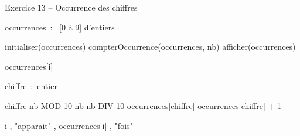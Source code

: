 \begin{Emphase}{Exercice 13 -- Occurrence des chiffres}

\begin{pseudoN}


    \Decl occurrences~:~ [0 à 9] d’entiers

    \Let initialiser(occurrences)
    \Let compterOccurrence(occurrences, nb)
    \Let afficher(occurrences)

\EndModule

    \Empty



        \Let occurrences[i] 

    \EndFor

\EndModule

    \Empty


    \Decl chiffre~:~entier


        \Let chiffre \Gets nb MOD 10
        \Let nb \Gets nb DIV 10
        \Let occurrences[chiffre] \Gets occurrences[chiffre] + 1

    \EndWhile

\EndModule

    \Empty


        

            \Write i , "apparait" , occurrences[i] , "fois"

        \EndIf

    \EndFor

\EndModule

\end{pseudoN}

\end{Emphase}


